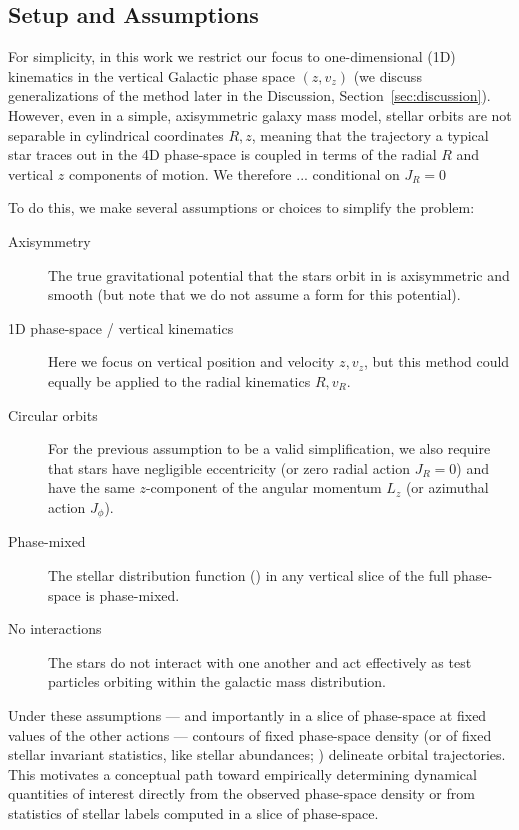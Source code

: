 \subsection{Setup and Assumptions} \label{sec:methods-setup}

For simplicity, in this work we restrict our focus to one-dimensional (1D) kinematics in
the vertical Galactic phase space $(z, v_z)$ (we discuss generalizations of the method
later in the Discussion, Section~\ref{sec:discussion}). %
However, even in a simple, axisymmetric galaxy mass model, stellar orbits are not
separable in cylindrical coordinates $R, z$, meaning that the trajectory a typical star
traces out in the 4D phase-space is coupled in terms of the radial $R$ and vertical $z$
components of motion.
We therefore ... conditional on $J_R=0$


To do this, we make several assumptions or choices to simplify the problem:
\begin{description}
    \item[Axisymmetry] The true gravitational potential that the stars orbit in is
    axisymmetric and smooth (but note that we do not assume a form for this potential).
    \item[1D phase-space / vertical kinematics] Here we focus on vertical position and
    velocity $z, v_z$, but this method could equally be applied to the radial kinematics
    $R, v_R$.
    \item[Circular orbits] For the previous assumption to be a valid simplification, we
    also require that stars have negligible eccentricity (or zero radial action $J_R=0$)
    and have the same $z$-component of the angular momentum $L_z$ (or azimuthal action
    $J_\phi$).
    \item[Phase-mixed] The stellar distribution function (\df) in any vertical slice of
    the full phase-space is phase-mixed.
    \item[No interactions] The stars do not interact with one another and act
    effectively as test particles orbiting within the galactic mass distribution.
\end{description}
Under these assumptions --- and importantly in a slice of phase-space at fixed values of
the other actions --- contours of fixed phase-space density (or of fixed stellar
invariant statistics, like stellar abundances; \citealt{Price-Whelan:2021}) delineate
orbital trajectories.
This motivates a conceptual path toward empirically determining dynamical quantities of
interest directly from the observed phase-space density or from statistics of stellar
labels computed in a slice of phase-space.

